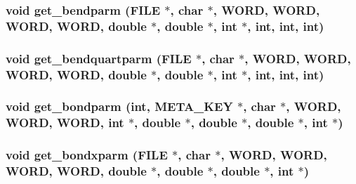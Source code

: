 \subsubsection{\setlength{\rightskip}{0pt plus 5cm}void get\_\-bendparm (FILE $\ast$, char $\ast$, {\bf WORD}, {\bf WORD}, {\bf WORD}, {\bf WORD}, double $\ast$, double $\ast$, int $\ast$, int, int, int)}\label{input_2proto__input_8h_d1a60cb4dcaf05428bf12fd400393c24}


\subsubsection{\setlength{\rightskip}{0pt plus 5cm}void get\_\-bendquartparm (FILE $\ast$, char $\ast$, {\bf WORD}, {\bf WORD}, {\bf WORD}, {\bf WORD}, double $\ast$, double $\ast$, int $\ast$, int, int, int)}\label{input_2proto__input_8h_90d4a732a0d938d881d9684d4d678a15}


\subsubsection{\setlength{\rightskip}{0pt plus 5cm}void get\_\-bondparm (int, {\bf META\_\-KEY} $\ast$, char $\ast$, {\bf WORD}, {\bf WORD}, {\bf WORD}, int $\ast$, double $\ast$, double $\ast$, double $\ast$, int $\ast$)}\label{input_2proto__input_8h_7718f86fb07cc223f2d3e11501366ed8}


\subsubsection{\setlength{\rightskip}{0pt plus 5cm}void get\_\-bondxparm (FILE $\ast$, char $\ast$, {\bf WORD}, {\bf WORD}, {\bf WORD}, {\bf WORD}, double $\ast$, double $\ast$, double $\ast$, int $\ast$)}\label{input_2proto__input_8h_4c20c39b2381ac59d1bb4acf0a4d9475}


